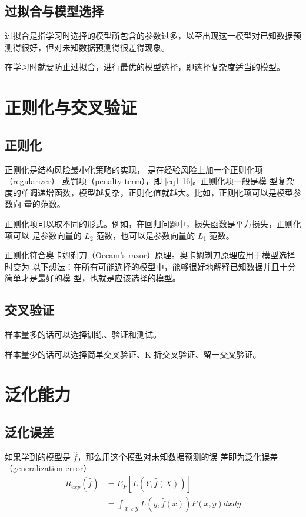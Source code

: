 \subsection{过拟合与模型选择}
\begin{definition}[过拟合]
    过拟合是指学习时选择的模型所包含的参数过多，以至出现这一模型对已知数据预测得很好，但对未知数据预测得很差得现象。
\end{definition}

在学习时就要防止过拟合，进行最优的模型选择，即选择复杂度适当的模型。
\section{正则化与交叉验证}
\subsection{正则化}
\begin{definition}[正则化]
    正则化是结构风险最小化策略的实现，
    是在经验风险上加一个正则化项（regularizer） 或罚项（penalty term），即 \autoref{eq1-16}。正则化项一般是模
    型复杂度的单调递增函数，模型越复杂，正则化值就越大。比如，正则化项可以是模型参数向
    量的范数。
\end{definition}

正则化项可以取不同的形式。例如，在回归问题中，损失函数是平方损失，正则化项可以
是参数向量的 $L_2$ 范数，也可以是参数向量的 $L_1$ 范数。

正则化符合奥卡姆剃刀（Occam's razor）原理。奥卡姆剃刀原理应用于模型选择时变为
以下想法：在所有可能选择的模型中，能够很好地解释已知数据并且十分简单才是最好的模
型，也就是应该选择的模型。
\subsection{交叉验证}
样本量多的话可以选择训练、验证和测试。

样本量少的话可以选择简单交叉验证、K 折交叉验证、留一交叉验证。
\section{泛化能力}
\subsection{泛化误差}
\begin{definition}[泛化误差]
    如果学到的模型是 $\hat{f}$，那么用这个模型对未知数据预测的误
    差即为泛化误差（generalization error）
    \begin{equation}
        \begin{aligned}
            R_{exp}(\hat{f}) & = E_P[L(Y,\hat{f}(X))]                                         \\
                             & = \int_{\mathcal{X}\times\mathcal{Y}}L(y,\hat{f}(x))P(x,y)dxdy \\
        \end{aligned}
    \end{equation}
\end{definition}

